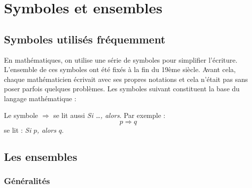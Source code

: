 \chapter{Symboles et ensembles}
\section{Symboles utilisés fréquemment}

En mathématiques, on utilise une série de symboles pour simplifier l'écriture. L'ensemble de ces symboles ont été fixés à la fin du 19ème siècle. Avant cela, chaque mathématicien écrivait avec ses propres notations et cela n'était pas sans poser parfois quelques problèmes. Les symboles suivant constituent la base du langage mathématique :

\vspace*{0.5cm}

\vspace*{0.5cm}



\begin{remarque}
Le symbole $\Rightarrow$ se lit aussi \emph{Si \dots, alors}. Par exemple :
$$
p\Rightarrow q
$$
se lit : \emph{Si $p$, alors $q$}.
\end{remarque}
\newpage
\section{Les ensembles}

\subsection{Généralités}

